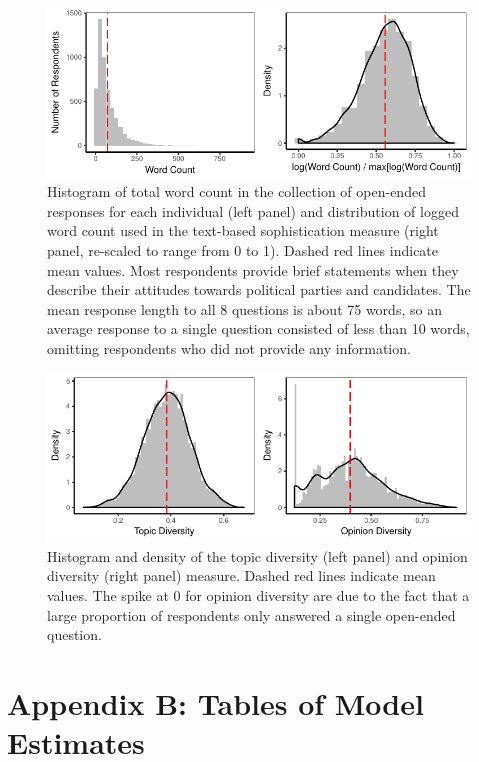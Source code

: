 \documentclass[12pt]{article}
\begin{document}
\begin{figure}[h]\centering
\includegraphics{../fig/wc.pdf}
\caption{Histogram of total word count in the collection of open-ended responses for each individual (left panel) and distribution of logged word count used in the text-based sophistication measure (right panel, re-scaled to range from 0 to 1). Dashed red lines indicate mean values. Most respondents provide brief statements when they describe their attitudes towards political parties and candidates. The mean response length to all 8 questions is about 75 words, so an average response to a single question consisted of less than 10 words, omitting respondents who did not provide any information.}\label{fig:wc}
\end{figure}

\begin{figure}[h]\centering
\includegraphics{../fig/diversity.pdf}
\caption{Histogram and density of the topic diversity (left panel) and opinion diversity (right panel) measure. Dashed red lines indicate mean values. The spike at 0 for opinion diversity are due to the fact that a large proportion of respondents only answered a single open-ended question.}\label{fig:diversity}
\end{figure}


\clearpage
\section*{Appendix B: Tables of Model Estimates}
\renewcommand\thefigure{B.\arabic{figure}}
\renewcommand\thetable{B.\arabic{table}}
\setcounter{figure}{0}
\setcounter{table}{0}







\end{document}
